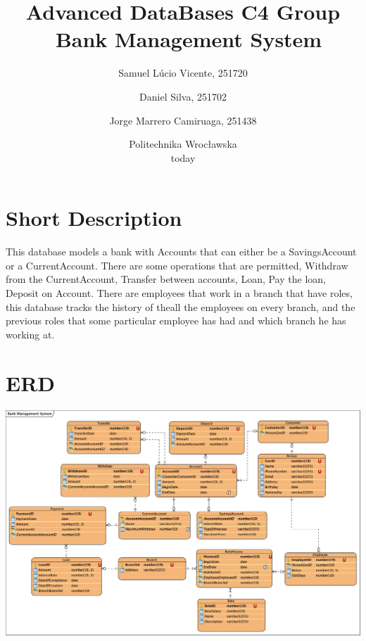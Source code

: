 \documentclass[a4paper, 10pt]{article}
\begin{document}
\title{Advanced DataBases C4 Group\\\
  \huge Bank Management System}
\author{
  Samuel Lúcio Vicente, 251720
  \and
  Daniel Silva, 251702
  \and
  Jorge Marrero Camiruaga, 251438
}

\date{Politechnika Wrocławska\\today}

\maketitle


\section{Short Description}
This database models a bank with Accounts that can either be a SavingsAccount or a CurrentAccount. There are some operations that are permitted, Withdraw from the CurrentAccount, Transfer between accounts, Loan, Pay the loan, Deposit on Account. There are employees that work in a branch that have roles, this database tracks the history of theall the employees on every branch, and the previous roles that some particular employee has had and which branch he has working at.

\section{ERD}
\includegraphics[width=\textwidth,height=\textheight,keepaspectratio]{bms}
\end{document}
